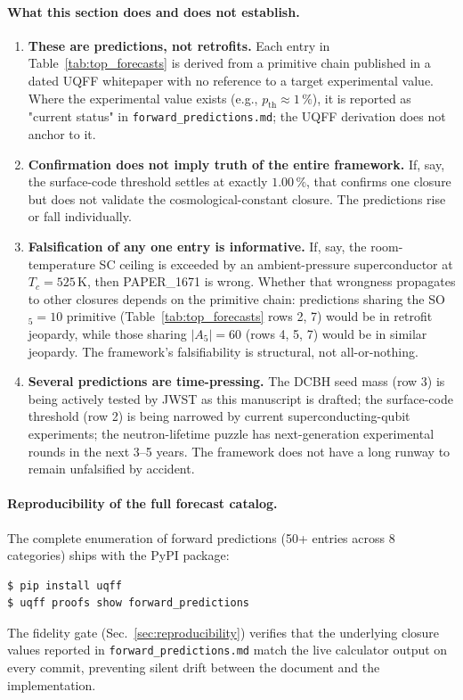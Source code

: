 \paragraph{What this section does and does not establish.}

\begin{enumerate}
  \item \textbf{These are predictions, not retrofits.} Each entry in
        Table~\ref{tab:top_forecasts} is derived from a primitive chain
        published in a dated UQFF whitepaper with no reference to a
        target experimental value. Where the experimental value exists
        (e.g., $p_{\text{th}} \approx 1\,\%$), it is reported as
        "current status" in \texttt{forward\_predictions.md}; the
        UQFF derivation does not anchor to it.
  \item \textbf{Confirmation does not imply truth of the entire
        framework.} If, say, the surface-code threshold settles at
        exactly $1.00\,\%$, that confirms one closure but does not
        validate the cosmological-constant closure. The predictions
        rise or fall individually.
  \item \textbf{Falsification of any one entry is informative.} If,
        say, the room-temperature SC ceiling is exceeded by an
        ambient-pressure superconductor at $T_c = 525\,\mathrm{K}$,
        then PAPER\_1671 is wrong. Whether that wrongness propagates
        to other closures depends on the primitive chain: predictions
        sharing the SO$_5 = 10$ primitive (Table~\ref{tab:top_forecasts}
        rows 2, 7) would be in retrofit jeopardy, while those sharing
        $|A_5|=60$ (rows 4, 5, 7) would be in similar jeopardy. The
        framework's falsifiability is structural, not all-or-nothing.
  \item \textbf{Several predictions are time-pressing.} The DCBH seed
        mass (row 3) is being actively tested by JWST as this
        manuscript is drafted; the surface-code threshold (row 2) is
        being narrowed by current superconducting-qubit experiments;
        the neutron-lifetime puzzle has next-generation
        experimental rounds in the next 3--5 years. The framework
        does not have a long runway to remain unfalsified by accident.
\end{enumerate}

\paragraph{Reproducibility of the full forecast catalog.}
The complete enumeration of forward predictions (50+ entries across 8
categories) ships with the PyPI package:
\begin{verbatim}
$ pip install uqff
$ uqff proofs show forward_predictions
\end{verbatim}
The fidelity gate (Sec.~\ref{sec:reproducibility}) verifies that the
underlying closure values reported in \texttt{forward\_predictions.md}
match the live calculator output on every commit, preventing silent
drift between the document and the implementation.

